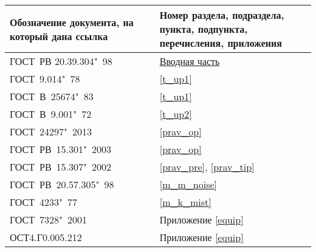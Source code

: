 \begin{table}[H]%
	\centering
	\renewcommand{\arraystretch}{1.5}
	\caption{ }\label{tab:gost}
	\begin{tabu} {@{}|X[cm]|X[2cm]|@{}}
		\hline
Обозначение документа, на который дана ссылка & Номер раздела, подраздела, пункта, подпункта, перечисления, приложения \\ \hline
ГОСТ~РВ 20.39.304"~98 & \hyperref[1int]{Вводная часть}	\\ \hline
ГОСТ~9.014"~78	& \ref{t_up1}	\\ \hline
ГОСТ~В~25674"~83 & \ref{t_up1}	\\  \hline
ГОСТ~В~9.001"~72 & \ref{t_up2}	\\ \hline
ГОСТ~24297"~2013 & \ref{prav_op} \\ \hline
ГОСТ~РВ~15.301"~2003 & \ref{prav_op} \\ \hline
ГОСТ~РВ~15.307"~2002 & \ref{prav_pre}, \ref{prav_tip} \\ \hline
ГОСТ~РВ~20.57.305"~98	& \ref{m_m_noise}	\\ \hline
ГОСТ~4233"~77	& \ref{m_k_mist}	\\ \hline
ГОСТ~7328"~2001	& Приложение \ref{equip}	\\ \hline
ОСТ4.Г0.005.212 & Приложение \ref{equip}	\\ \hline
	\end{tabu}
\end{table}